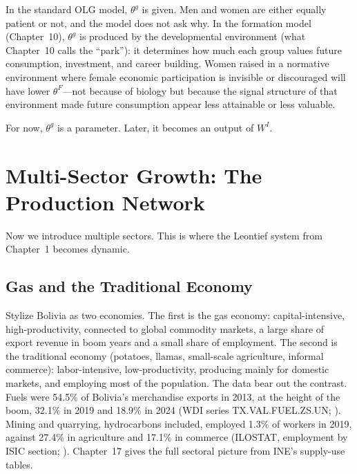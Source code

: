 \documentclass[../structural_economics_book.tex]{subfiles}
\begin{document}
\begin{intuition}
In the standard OLG model, $\theta^g$ is given. Men and women are either equally patient or not, and the model does not ask why. In the formation model (Chapter~10), $\theta^g$ is produced by the developmental environment (what Chapter~10 calls the ``park''): it determines how much each group values future consumption, investment, and career building. Women raised in a normative environment where female economic participation is invisible or discouraged will have lower $\theta^F$---not because of biology but because the signal structure of that environment made future consumption appear less attainable or less valuable.

For now, $\theta^g$ is a parameter. Later, it becomes an output of $W^I$.
\end{intuition}


\section{Multi-Sector Growth: The Production Network}
\label{ch03:sec:multi_sector}

Now we introduce multiple sectors. This is where the Leontief system from Chapter~1 becomes dynamic.

\subsection{Gas and the Traditional Economy}

Stylize Bolivia as two economies. The first is the gas economy: capital-intensive, high-productivity, connected to global commodity markets, a large share of export revenue in boom years and a small share of employment. The second is the traditional economy (potatoes, llamas, small-scale agriculture, informal commerce): labor-intensive, low-productivity, producing mainly for domestic markets, and employing most of the population. The data bear out the contrast. Fuels were 54.5\% of Bolivia's merchandise exports in 2013, at the height of the boom, 32.1\% in 2019 and 18.9\% in 2024 (WDI series TX.VAL.FUEL.ZS.UN; \citealp{worldbank2026wdi}). Mining and quarrying, hydrocarbons included, employed 1.3\% of workers in 2019, against 27.4\% in agriculture and 17.1\% in commerce (ILOSTAT, employment by ISIC section; \citealp{ilo2026ilostat}). Chapter~17 gives the full sectoral picture from INE's supply-use tables.
\end{document}
